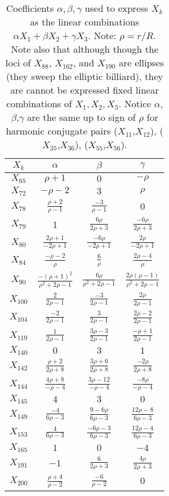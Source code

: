 \begin{table}
\begin{minipage}{2.0in}
\begin{tabular}{|c|c|c|c|}
\hline
$X_k$ & $\alpha$ & $\beta$ & $\gamma$ \\
\hline
$X_{65}$ & $\rho+1$ & $0$ & $-\rho$ \\ 
$X_{72}$ & $-\rho-2$ & $3$ & $\rho$ \\
$X_{78}$ & $\frac{\rho+2}{\rho-1}$ & $\frac{-3}{\rho-1}$ & $0$ \\ 
$X_{79}$ & 1 & $\frac{6\rho}{2\rho+3}$ & $\frac{-6\rho}{2\rho+3}$ \\ 
$X_{80}$ & $\frac{2\rho+1}{-2\rho+1}$ & $\frac{-6\rho}{-2\rho+1}$ &  $\frac{2\rho}{-2\rho+1}$ \\
$X_{84}$ & $\frac{-\rho-2}{\rho}$ & $\frac{6}{\rho}$ & $\frac{2\rho-4}{\rho}$ \\ 
$X_{90}$ & $\frac{-(\rho+1)^2}{\rho^2+2\rho-1}$ & $\frac{6\rho}{\rho^2+2\rho-1}$ & $\frac{2\rho(\rho-1)}{\rho^2+2\rho-1}$\\ 
$X_{100}$ & $\frac{2}{2\rho-1}$ & $\frac{-3}{2\rho-1}$ & $\frac{2\rho}{2\rho-1}$ \\
$X_{104}$ & $\frac{-2}{2\rho-1}$ & $\frac{3}{2\rho-1}$ & $\frac{2\rho-2}{2\rho-1}$ \\ 
$X_{119}$ & $\frac{1}{2\rho-1}$ & $\frac{3\rho-3}{2\rho-1}$ & $\frac{-\rho+1}{2\rho-1}$ \\
$X_{140}$ & $0$ & $3$ & $1$  \\
$X_{142}$ & $\frac{\rho+2}{2\rho+8}$ & $\frac{3\rho+6}{2\rho+8}$ & $\frac{-2\rho}{2\rho+8}$ \\
$X_{144}$ & $\frac{4\rho+8}{-\rho-4}$ & $\frac{3\rho-12}{-\rho-4}$ & $\frac{-8\rho}{-\rho-4}$\\
$X_{145}$ & $4$ & $3$ & $0$ \\
$X_{149}$ & $\frac{-4}{6\rho-3}$ &  $\frac{9-6\rho}{6\rho-3}$ &  $\frac{12\rho-8}{6\rho-3}$ \\
$X_{153}$ & $\frac{4}{6\rho-3}$ & $\frac{-6\rho-3}{6\rho-3}$ & $\frac{12\rho-4}{6\rho-3}$ \\
$X_{165}$ & $1$ & $0$ & $-4$ \\
$X_{191}$ & $-1$ & $\frac{6}{2\rho+3}$ & $\frac{4\rho}{2\rho+3}$ \\
$X_{200}$ & $\frac{\rho+4}{\rho-2}$ & $\frac{-6}{\rho-2}$ & $0$ \\
\hline
\end{tabular}
\end{minipage}
\caption{Coefficients $\alpha,\beta,\gamma$ used to express $X_k$ as the linear combinations $\alpha X_1+\beta X_2+\gamma X_3$. Note: $\rho=r/R$. Note also that although though the loci of $X_{88}$, $X_{162}$, and $X_{190}$ are ellipses (they sweep the elliptic billiard), they are cannot be expressed fixed linear combinations of $X_1,X_2,X_3$. Notice $\alpha$,$\beta$,$\gamma$ are the same up to sign of $\rho$ for harmonic conjugate pairs ($X_{11}$,$X_{12}$), ($X_{35}$,$X_{36}$), ($X_{55}$,$X_{56}$).}
\label{tab:07-abg}
\end{table}

